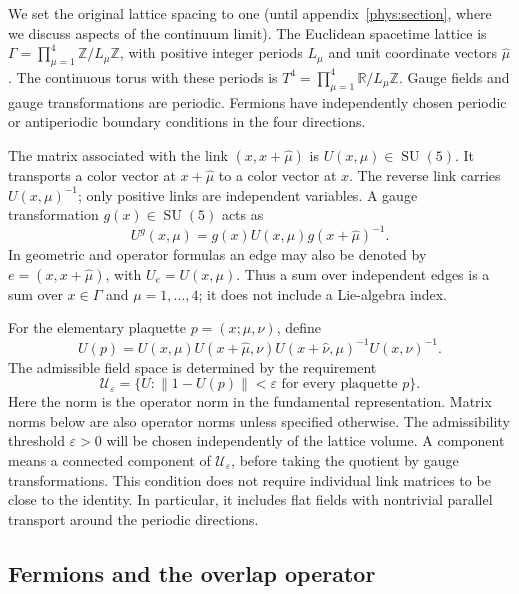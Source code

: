 \documentclass[11pt,a4paper]{article}
\theoremstyle{remark}
\DeclareMathOperator{\SU}{SU}
\newcommand{\eps}{\varepsilon}
\begin{document}
We set the original lattice spacing to one (until appendix~\ref{phys:section}, where we discuss aspects of the continuum limit). The Euclidean spacetime lattice is
\(\Gamma=\prod_{\mu=1}^4\mathbb Z/L_\mu\mathbb Z\), with
positive integer periods \(L_\mu\) and unit coordinate vectors
\(\hat\mu\). The continuous torus with these periods is
\(T^4=\prod_{\mu=1}^4\mathbb R/L_\mu\mathbb Z\).
Gauge fields and gauge transformations are periodic. Fermions
have independently chosen periodic or antiperiodic boundary
conditions in the four directions.

The matrix associated with the link \((x,x+\hat\mu)\) is
\(U(x,\mu)\in\SU(5)\). It transports a color vector at
\(x+\hat\mu\) to a color vector at \(x\). The reverse link
carries \(U(x,\mu)^{-1}\); only positive links are independent
variables. A gauge transformation \(g(x)\in\SU(5)\) acts as
\begin{equation}
 U^g(x,\mu)=g(x)U(x,\mu)g(x+\hat\mu)^{-1}.
\end{equation}
In geometric and operator formulas an edge may also be denoted
by \(e=(x,x+\hat\mu)\), with \(U_e=U(x,\mu)\).
Thus a sum over independent edges is a sum over \(x\in\Gamma\)
and \(\mu=1,\ldots,4\); it does not include a Lie-algebra index.

For the elementary plaquette \(p=(x;\mu,\nu)\), define
\begin{equation}
 U(p)=U(x,\mu)U(x+\hat\mu,\nu)
       U(x+\hat\nu,\mu)^{-1}U(x,\nu)^{-1}.
\end{equation}
The admissible field space is determined by the requirement
\begin{equation}
 \mathcal U_\eps=
 \{U:\|1-U(p)\|<\eps\text{ for every plaquette }p\}.
 \label{eq:admissibility}
\end{equation}
Here the norm is the operator norm in the fundamental
representation. Matrix norms below are also operator norms
unless specified otherwise. The admissibility threshold \(\eps>0\) will be
chosen independently of the lattice volume. A component means
a connected component of \(\mathcal U_\eps\), before taking
the quotient by gauge transformations. This condition does not require individual link matrices to be
close to the identity. In particular, it includes flat fields
with nontrivial parallel transport around the periodic directions.

\subsection{Fermions and the overlap operator}
\end{document}
